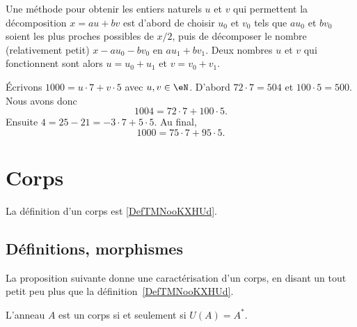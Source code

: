\begin{normaltext}
	Une méthode pour obtenir les entiers naturels \( u\) et \( v\) qui permettent la décomposition \(x = au + bv \) est d'abord de choisir \( u_0\) et \( v_0\) tels que \( au_0 \) et \( bv_0 \) soient les plus proches possibles de \( x/2\), puis de décomposer le nombre (relativement petit) \( x - au_0 - bv_0 \) en \( au_1 + bv_1 \). Deux nombres \( u\) et \( v\) qui fonctionnent sont alors \( u = u_0 + u_1\) et \( v = v_0 + v_1\).
\end{normaltext}

\begin{example}
	Écrivons \( 1000=u\cdot 7+v\cdot 5\) avec \( u,v\in \eN\). D'abord \( 72\cdot 7=504\) et \( 100\cdot 5=500\). Nous avons donc
	\begin{equation}
		1004=72\cdot 7+100\cdot 5.
	\end{equation}
	Ensuite \( 4=25-21=-3\cdot 7+5\cdot 5\). Au final,
	\begin{equation}
		1000=75\cdot 7+95\cdot 5.
	\end{equation}
\end{example}


\section{Corps}

La définition d'un corps est \ref{DefTMNooKXHUd}.

\subsection{Définitions, morphismes}

La proposition suivante donne une caractérisation d'un corps, en disant un tout petit peu plus que la définition~\ref{DefTMNooKXHUd}.
\begin{proposition}
	L'anneau \( A\) est un corps si et seulement si \( U(A) = A^* \).
\end{proposition}

